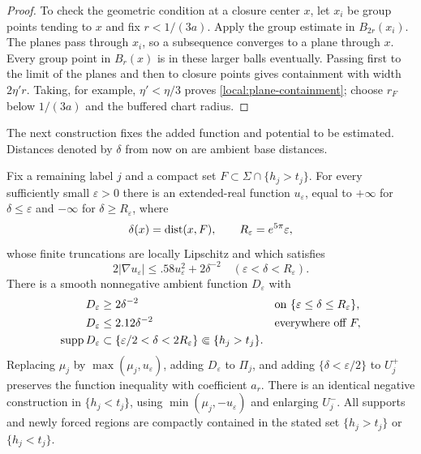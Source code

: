 \begin{proof}
To check the geometric condition at a closure center $x$, let
$x_i$ be group points tending to $x$ and fix $r<1/(3a)$.  Apply the
group estimate in $B_{2r}(x_i)$.  The planes pass through $x_i$, so a
subsequence converges to a plane through $x$.  Every group point in
$B_r(x)$ is in these larger balls eventually.  Passing first to the
limit of the planes and then to closure points gives containment with
width $2\eta'r$.  Taking, for example, $\eta'<\eta/3$ proves
\eqref{local:plane-containment}; choose $r_F$ below $1/(3a)$ and the buffered
chart radius.
\end{proof}

The next construction fixes the added function and potential to be estimated.
Distances denoted by $\delta$ from now on are ambient base distances.

\begin{lemma}\label{local:shell}
Fix a remaining label $j$ and a compact set
$F\subset\Sigma\cap\{h_j>t_j\}$.
For every sufficiently small $\varepsilon>0$ there is an extended-real
function $u_\varepsilon$, equal to $+\infty$ for $\delta\le\varepsilon$
and $-\infty$ for $\delta\ge R_\varepsilon$, where
\[
 \delta(x)=\operatorname{dist}(x,F),\qquad R_\varepsilon=e^{5\pi}\varepsilon,
\]
whose finite truncations are locally Lipschitz and which satisfies
\begin{equation}\label{local:shell-gradient}
 2|\nabla u_\varepsilon|
       \le .58u_\varepsilon^2+2\delta^{-2}
       \quad (\varepsilon<\delta<R_\varepsilon).
\end{equation}
There is a smooth nonnegative ambient function $D_\varepsilon$ with
\begin{equation}\label{local:shell-potential}
 \begin{aligned}
 D_\varepsilon&\ge2\delta^{-2}
       &&\text{on }\{\varepsilon\le\delta\le R_\varepsilon\},\\
 D_\varepsilon&\le2.12\delta^{-2}
       &&\text{everywhere off }F,\\
 \operatorname{supp} D_\varepsilon&\subset
       \{\varepsilon/2<\delta<2R_\varepsilon\}
       \Subset\{h_j>t_j\}.
 \end{aligned}
\end{equation}
Replacing $\mu_j$ by $\max(\mu_j,u_\varepsilon)$, adding
$D_\varepsilon$ to $\Pi_j$, and adding
$\{\delta<\varepsilon/2\}$ to $U_j^+$ preserves the function inequality
with coefficient $a_r$.  There is an identical negative construction
in $\{h_j<t_j\}$, using $\min(\mu_j,-u_\varepsilon)$ and enlarging
$U_j^-$.  All supports and newly forced regions are compactly
contained in the stated set $\{h_j>t_j\}$ or $\{h_j<t_j\}$.
\end{lemma}
